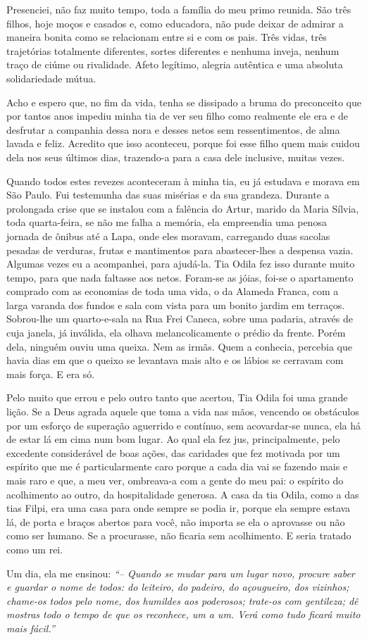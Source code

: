 Presenciei, não faz muito tempo, toda a família do meu primo reunida.
São três filhos, hoje moços e casados e, como educadora, não pude deixar de admirar a maneira bonita como se relacionam entre si e com os pais.
Três vidas, três trajetórias totalmente diferentes, sortes diferentes e nenhuma inveja, nenhum traço de ciúme ou rivalidade.
Afeto legítimo, alegria autêntica e uma absoluta solidariedade mútua.

Acho e espero que, no fim da vida, tenha se dissipado a bruma do preconceito que por tantos anos impediu minha tia de ver seu filho como realmente ele era e de desfrutar a companhia dessa nora e desses netos sem ressentimentos, de alma lavada e feliz.
Acredito que isso aconteceu, porque foi esse filho quem mais cuidou dela nos seus últimos dias, trazendo-a para a casa dele inclusive, muitas vezes.

 
Quando todos estes revezes aconteceram à minha tia, eu já estudava e morava em São Paulo.
Fui testemunha das suas misérias e da sua grandeza.
Durante a prolongada crise que se instalou com a falência do Artur, marido da Maria Sílvia, toda quarta-feira, se não me falha a memória, ela empreendia uma penosa jornada de ônibus até a Lapa, onde eles moravam, carregando duas sacolas pesadas de verduras, frutas e mantimentos para abastecer-lhes a despensa vazia.
Algumas vezes eu a acompanhei, para ajudá-la.
Tia Odila fez isso durante muito tempo, para que nada faltasse aos netos.
Foram-se as jóias, foi-se o apartamento comprado com as economias de toda uma vida, o da Alameda Franca, com a larga varanda dos fundos e sala com vista para um bonito jardim em terraços.
Sobrou-lhe um quarto-e-sala na Rua Frei Caneca, sobre uma padaria, através de cuja janela, já inválida, ela olhava melancolicamente o prédio da frente.
Porém dela, ninguém ouviu uma queixa.
Nem as irmãs.
Quem a conhecia, percebia que havia dias em que o queixo se levantava mais alto e os lábios se cerravam com mais força.
E era só.
 

Pelo muito que errou e pelo outro tanto que acertou, Tia Odila foi uma grande lição.
Se a Deus agrada aquele que toma a vida nas mãos, vencendo os obstáculos por um esforço de superação aguerrido e contínuo, sem acovardar-se nunca, ela há de estar lá em cima num bom lugar.
Ao qual ela fez jus, principalmente, pelo excedente considerável de boas ações, das caridades que fez motivada por um espírito que me é particularmente caro porque a cada dia vai se fazendo mais e mais raro e que, a meu ver, ombreava-a com a gente do meu pai: o espírito do acolhimento ao outro, da hospitalidade generosa.
A casa da tia Odila, como a das tias Filpi, era uma casa para onde sempre se podia ir, porque ela sempre estava lá, de porta e braços abertos para você, não importa se ela o aprovasse ou não como ser humano.
Se a procurasse, não ficaria sem acolhimento.
E seria tratado como um rei.


Um dia, ela me ensinou: 
{\itshape``-- Quando se mudar para um lugar novo, procure saber e guardar o nome de todos: do leiteiro, do padeiro, do açougueiro, dos vizinhos; chame-os todos pelo nome, dos humildes aos poderosos; trate-os com gentileza; dê mostras todo o tempo de que os reconhece, um a um.
Verá como tudo ficará muito mais fácil.''}

